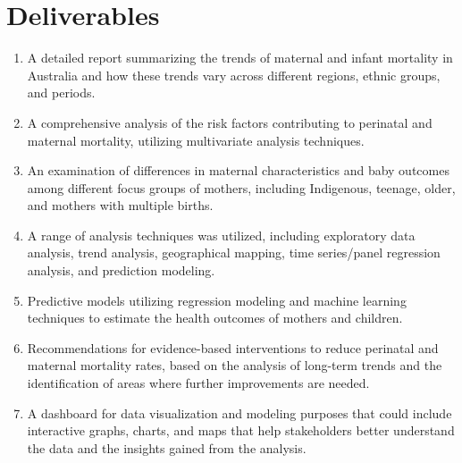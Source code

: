 \section{Deliverables}
\begin{enumerate}
    \item A detailed report summarizing the trends of maternal and infant mortality in Australia and how these trends vary across different regions, ethnic groups, and periods.
    \item A comprehensive analysis of the risk factors contributing to perinatal and maternal mortality, utilizing multivariate analysis techniques.
    \item An examination of differences in maternal characteristics and baby outcomes among different focus groups of mothers, including Indigenous, teenage, older, and mothers with multiple births. 
    \item A range of analysis techniques was utilized, including exploratory data analysis, trend analysis, geographical mapping, time series/panel regression analysis, and prediction modeling.
    \item Predictive models utilizing regression modeling and machine learning techniques to estimate the health outcomes of mothers and children.
    \item Recommendations for evidence-based interventions to reduce perinatal and maternal mortality rates, based on the analysis of long-term trends and the identification of areas where further improvements are needed.
    \item A dashboard for data visualization and modeling purposes that could include interactive graphs, charts, and maps that help stakeholders better understand the data and the insights gained from the analysis.
\end{enumerate}